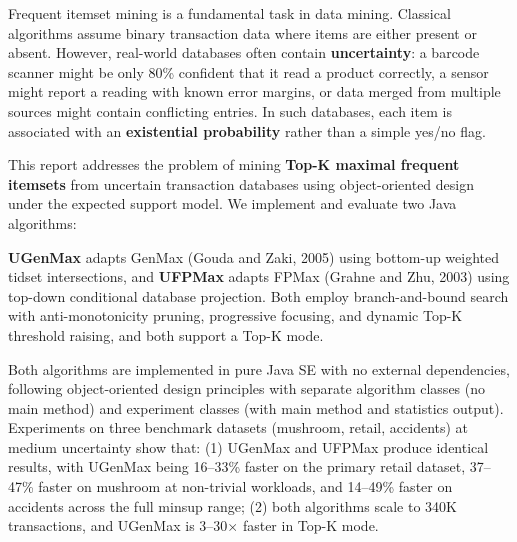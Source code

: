 \documentclass[12pt,a4paper]{report}
\begin{document}
  Frequent itemset mining is a fundamental task in data mining. Classical algorithms assume binary transaction data where items are either present or absent. However, real-world databases often contain \textbf{uncertainty}: a barcode scanner might be only 80\% confident that it read a product correctly, a sensor might report a reading with known error margins, or data merged from multiple sources might contain conflicting entries. In such databases, each item is associated with an \textbf{existential probability} rather than a simple yes/no flag.

  This report addresses the problem of mining \textbf{Top-K maximal frequent itemsets} from uncertain transaction databases using object-oriented design under the expected support model. We implement and evaluate two Java algorithms:

  \textbf{UGenMax} adapts GenMax (Gouda and Zaki, 2005) using bottom-up weighted tidset intersections, and \textbf{UFPMax} adapts FPMax (Grahne and Zhu, 2003) using top-down conditional database projection. Both employ branch-and-bound search with anti-monotonicity pruning, progressive focusing, and dynamic Top-K threshold raising, and both support a Top-K mode.

  Both algorithms are implemented in pure Java SE with no external dependencies, following object-oriented design principles with separate algorithm classes (no main method) and experiment classes (with main method and statistics output). Experiments on three benchmark datasets (mushroom, retail, accidents) at medium uncertainty show that: (1) UGenMax and UFPMax produce identical results, with UGenMax being 16--33\% faster on the primary retail dataset, 37--47\% faster on mushroom at non-trivial workloads, and 14--49\% faster on accidents across the full minsup range; (2) both algorithms scale to 340K transactions, and UGenMax is 3--30$\times$ faster in Top-K mode.

  \pagebreak

  \tableofcontents

  \listoffigures

\end{document}
